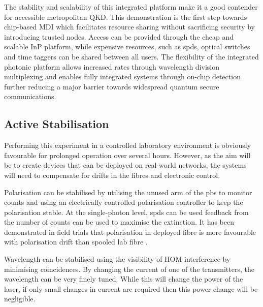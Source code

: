 
The stability and scalability of this integrated platform make it a good contender for accessible metropolitan \ac{QKD}. This demonstration is the first step towards chip-based \ac{MDI} which facilitates resource sharing without sacrificing security by introducing trusted nodes. Access can be provided through the cheap and scalable \ac{InP} platform, while expensive resources, such as \acp{spd}, optical switches and time taggers can be shared between all users. The flexibility of the integrated photonic platform allows increased rates through wavelength division multiplexing \cite{price2018} and enables fully integrated systems through on-chip detection \cite{akhlaghi2015} further reducing a major barrier towards widespread quantum secure communications.

\subsection{Active Stabilisation}

Performing this experiment in a controlled laboratory environment is obviously favourable for prolonged operation over several hours. However, as the aim will be to create devices that can be deployed on real-world networks, the systems will need to compensate for drifts in the fibres and electronic control.


Polarisation can be stabilised by utilising the unused arm of the \ac{pbs} to monitor counts and using an electrically controlled polarisation controller to keep the polarisation stable. At the single-photon level, \acp{spd} can be used feedback from the number of counts can be used to maximise the extinction. It has been demonstrated in field trials that polarisation in deployed fibre is more favourable with polarisation drift than spooled lab fibre \cite{wengerowsky2019}.

Wavelength can be stabilised using the visibility of \ac{HOM} interference by minimising coincidences. By changing the current of one of the transmitters, the wavelength can be very finely tuned. While this will change the power of the laser, if only small changes in current are required then this power change will be negligible.

